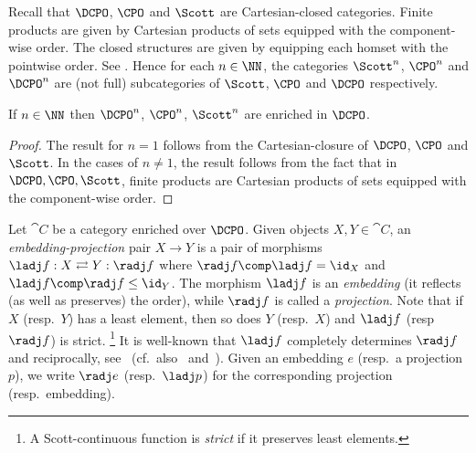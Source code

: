 Recall that $\DCPO$, $\CPO$ and $\Scott$ are Cartesian-closed categories.
Finite products are given by Cartesian products
of sets equipped with the component-wise order.
The closed structures are
given by equipping each homset with the pointwise order.
See \cite[Theorem~3.3.3, Theorem~3.3.5 and Corollary~4.1.6]{aj95chapter}.
Hence for each $n \in \NN$, the categories
$\Scott^n$, $\CPO^n$ and $\DCPO^n$
are (not full) subcategories of $\Scott$, $\CPO$ and $\DCPO$
respectively.

\begin{lemma}
\label{lem:proof:scott:enrich}
If $n \in \NN$ then
$\DCPO^n$,
$\CPO^n$, $\Scott^n$ are enriched in $\DCPO$.
\end{lemma}

\begin{proof}
The result for $n=1$ follows from the
Cartesian-closure of $\DCPO$, $\CPO$ and $\Scott$.
In the cases of $n \neq 1$, the result follows from the fact that
in $\DCPO, \CPO, \Scott$, finite products are Cartesian products
of sets equipped with the component-wise order.
\end{proof}

Let $\cat C$ be a category enriched over $\DCPO$.
Given objects $X,Y \in \cat C$,
an \emph{embedding-projection} pair $X \to Y$
is a pair of morphisms $\ladj f: X\rightleftarrows Y:\radj f$
where $\radj f \comp \ladj f = \id_X$ and $\ladj f \comp \radj f \leq \id_Y$.
The morphism $\ladj f$ is an \emph{embedding}
(it reflects (as well as preserves) the order),
while $\radj f$ is called a \emph{projection}.
Note that if $X$ (resp.\ $Y$) has a least element,
then so does $Y$ (resp.\ $X$) and $\ladj f$ (resp $\radj f$)
is strict.%
\footnote{A Scott-continuous function is \emph{strict} if it preserves
least elements.}
It is well-known that $\ladj f$ completely determines $\radj f$
and reciprocally, see~\cite[\S 7.1]{ac98book}
(cf.\ also~\cite[\S 3.1.4]{aj95chapter} and~\cite[\S 9]{streicher06book}).
Given an embedding $e$ (resp.\ a projection $p$),
we write $\radj e$ (resp.\ $\ladj p$)
for the corresponding projection (resp.\ embedding).

